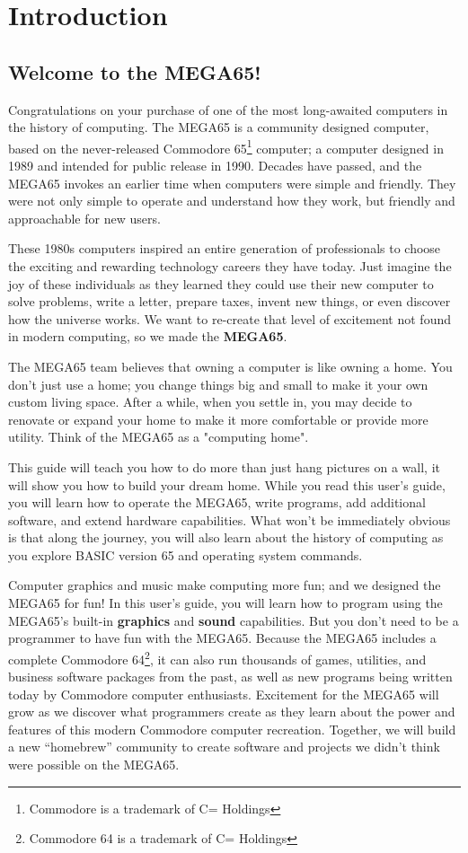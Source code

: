 \chapter{Introduction}

\section{Welcome to the MEGA65!}

Congratulations on your purchase of one of the most long-awaited computers in the history of computing. The MEGA65 is a community designed computer, based on the never-released Commodore{\textregistered} 65\footnote{Commodore is a trademark of C= Holdings} computer; a computer designed in 1989 and intended for public release in 1990. Decades have passed, and the MEGA65 invokes an earlier time when computers were simple and friendly. They were not only simple to operate and understand how they work, but friendly and approachable for new users.

These 1980s computers inspired an entire generation of professionals to choose the exciting and rewarding technology careers they have today. Just imagine the joy of these individuals as they learned they could use their new computer to solve problems, write a letter, prepare taxes, invent new things, or even discover how the universe works. We want to re-create that level of excitement not found in modern computing, so we made the {\bf MEGA65}.

The MEGA65 team believes that owning a computer is like owning a home. You don't just use a home; you change things big and small to make it your own custom living space. After a while, when you settle in, you may decide to renovate or expand your home to make it more comfortable or provide more utility. Think of the MEGA65 as a "computing home".

This guide will teach you how to do more than just hang pictures on a wall, it will show you how to build your dream home. While you read this user's guide, you will learn how to operate the MEGA65, write programs, add additional software, and extend hardware capabilities. What won't be immediately obvious is that along the journey, you will also learn about the history of computing as you explore BASIC version 65 and operating system commands.

Computer graphics and music make computing more fun; and we designed the MEGA65 for fun! In this user's guide, you will learn how to program using the MEGA65's built-in {\bf graphics} and {\bf sound} capabilities. But you don't need to be a programmer to have fun with the MEGA65. Because the MEGA65 includes a complete Commodore{\textregistered} 64{\texttrademark}\footnote{Commodore 64 is a trademark of C= Holdings}, it can also run thousands of games, utilities, and business software packages from the past, as well as new programs being written today by Commodore computer enthusiasts. Excitement for the MEGA65 will grow as we discover what programmers create as they learn about the power and features of this modern Commodore computer recreation. Together, we will build a new ``homebrew'' community to create software and projects we didn't think were possible on the MEGA65.

